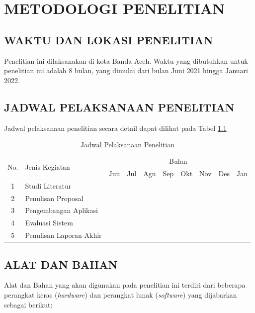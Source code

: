 \fancyhf{} 
\fancyfoot[C]{\thepage}
\chapter{METODOLOGI PENELITIAN}

\section{\uppercase{WAKTU DAN LOKASI PENELITIAN}}
Penelitian ini dilaksanakan di kota Banda Aceh. Waktu yang dibutuhkan untuk penelitian ini adalah 8 bulan, yang dimulai dari bulan Juni 2021 hingga Januari 2022.

\section{\uppercase{JADWAL PELAKSANAAN PENELITIAN}}
Jadwal pelaksanaan penelitian secara detail dapat dilihat pada Tabel \ref{tab:jadwal}

\begin{table}[H]
	\begin{center}
	\caption{Jadwal Pelaksanaan Penelitian}
	\label{tab:jadwal}
	\begin{tabular}{|c|l|c|c|c|c|c|c|c|c|}
	\hline
	\multirow{2}{*}{No.}&\multirow{2}{*}{Jenis Kegiatan}&\multicolumn{8}{c|}{Bulan}\\
	\cline{3-10}
	&&Jun&Jul&Agu&Sep&Okt&Nov&Des&Jan\\
	\hline
	1&Studi Literatur&\cellcolor{gray}&\cellcolor{gray}&&&&&&\\
	\hline
	2&Penulisan Proposal&&&\cellcolor{gray}&\cellcolor{gray}&&&&\\
	\hline
	3&Pengembangan Aplikasi&&&\cellcolor{gray}&\cellcolor{gray}&\cellcolor{gray}&&&\\
	\hline
	4&Evaluasi Sistem&&&&&&\cellcolor{gray}&\cellcolor{gray}&\\
	\hline
	5&Penulisan Laporan Akhir&&&&&&&&\cellcolor{gray}\\
	\hline
	\end{tabular}
	\end{center}
\end{table}

\section{\uppercase{ALAT DAN BAHAN}}
Alat dan Bahan yang akan digunakan pada penelitian ini terdiri dari beberapa perangkat keras (\textit{hardware}) dan perangkat lunak (\textit{software}) yang dijabarkan sebagai berikut:


